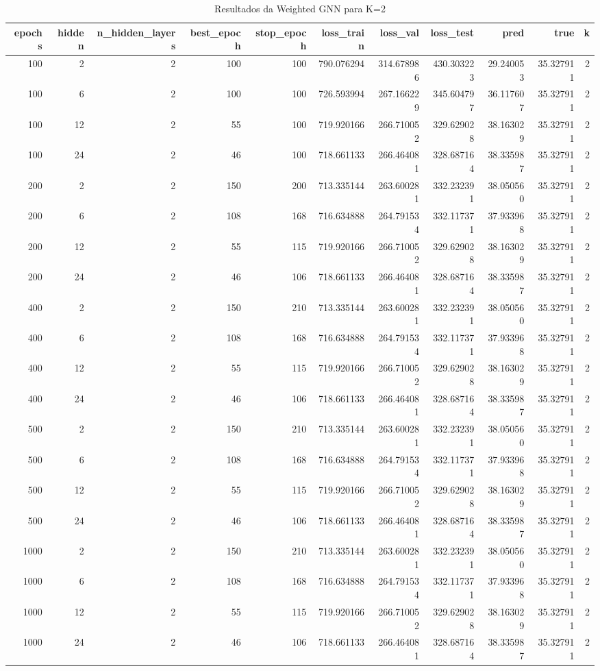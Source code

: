 \begin{table}
\caption{Resultados da Weighted GNN para K=2}
\label{tab:weighted_gnn_results_k2}
\begin{tabular}{rrrrrrrrrrr}
\toprule
epochs & hidden & n\_hidden\_layers & best\_epoch & stop\_epoch & loss\_train & loss\_val & loss\_test & pred & true & k \\
\midrule
100 & 2 & 2 & 100 & 100 & 790.076294 & 314.678986 & 430.303223 & 29.240053 & 35.327911 & 2 \\
100 & 6 & 2 & 100 & 100 & 726.593994 & 267.166229 & 345.604797 & 36.117607 & 35.327911 & 2 \\
100 & 12 & 2 & 55 & 100 & 719.920166 & 266.710052 & 329.629028 & 38.163029 & 35.327911 & 2 \\
100 & 24 & 2 & 46 & 100 & 718.661133 & 266.464081 & 328.687164 & 38.335987 & 35.327911 & 2 \\
200 & 2 & 2 & 150 & 200 & 713.335144 & 263.600281 & 332.232391 & 38.050560 & 35.327911 & 2 \\
200 & 6 & 2 & 108 & 168 & 716.634888 & 264.791534 & 332.117371 & 37.933968 & 35.327911 & 2 \\
200 & 12 & 2 & 55 & 115 & 719.920166 & 266.710052 & 329.629028 & 38.163029 & 35.327911 & 2 \\
200 & 24 & 2 & 46 & 106 & 718.661133 & 266.464081 & 328.687164 & 38.335987 & 35.327911 & 2 \\
400 & 2 & 2 & 150 & 210 & 713.335144 & 263.600281 & 332.232391 & 38.050560 & 35.327911 & 2 \\
400 & 6 & 2 & 108 & 168 & 716.634888 & 264.791534 & 332.117371 & 37.933968 & 35.327911 & 2 \\
400 & 12 & 2 & 55 & 115 & 719.920166 & 266.710052 & 329.629028 & 38.163029 & 35.327911 & 2 \\
400 & 24 & 2 & 46 & 106 & 718.661133 & 266.464081 & 328.687164 & 38.335987 & 35.327911 & 2 \\
500 & 2 & 2 & 150 & 210 & 713.335144 & 263.600281 & 332.232391 & 38.050560 & 35.327911 & 2 \\
500 & 6 & 2 & 108 & 168 & 716.634888 & 264.791534 & 332.117371 & 37.933968 & 35.327911 & 2 \\
500 & 12 & 2 & 55 & 115 & 719.920166 & 266.710052 & 329.629028 & 38.163029 & 35.327911 & 2 \\
500 & 24 & 2 & 46 & 106 & 718.661133 & 266.464081 & 328.687164 & 38.335987 & 35.327911 & 2 \\
1000 & 2 & 2 & 150 & 210 & 713.335144 & 263.600281 & 332.232391 & 38.050560 & 35.327911 & 2 \\
1000 & 6 & 2 & 108 & 168 & 716.634888 & 264.791534 & 332.117371 & 37.933968 & 35.327911 & 2 \\
1000 & 12 & 2 & 55 & 115 & 719.920166 & 266.710052 & 329.629028 & 38.163029 & 35.327911 & 2 \\
1000 & 24 & 2 & 46 & 106 & 718.661133 & 266.464081 & 328.687164 & 38.335987 & 35.327911 & 2 \\
\bottomrule
\end{tabular}
\end{table}
